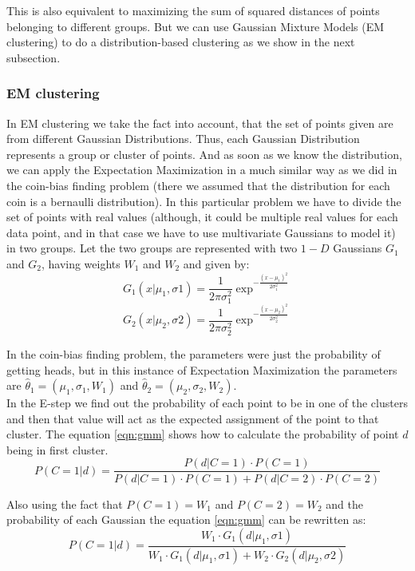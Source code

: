 \documentclass[journal, compsoc]{IEEEtran}
\begin{document}
This is also equivalent to maximizing the sum of squared distances of points belonging to different groups. But we can use Gaussian Mixture Models (EM clustering) to
do a distribution-based clustering as we show in the next subsection.

\subsubsection{EM clustering}
In EM clustering we take the fact into account, that the set of points given are from different Gaussian Distributions.
Thus, each Gaussian Distribution represents a group or cluster of points\cite{aibook}. And as soon as we know the distribution, we can
apply the Expectation Maximization in a much similar way as we did in the coin-bias finding problem (there we assumed that the
distribution for each coin is a bernaulli distribution). In this particular problem we have to divide the set of points with
real values (although, it could be multiple real values for each data point, and in that case we have to use multivariate
Gaussians to model it) in two groups. Let the two groups are represented with two $1-D$ Gaussians $G_{1}$ and $G_{2}$, having
weights $W_1$ and $W_2$ and given by:
\[
    G_{1}(x | \mu_{1}, \sigma{1}) = \frac{1}{2\pi\sigma_{1}^{2}}\exp^{-\frac{(x - \mu_{1})^{2}}{2\sigma_{1}^{2}}}
\]
\[
    G_{2}(x | \mu_{2}, \sigma{2}) = \frac{1}{2\pi\sigma_{2}^{2}}\exp^{-\frac{(x - \mu_{2})^{2}}{2\sigma_{2}^{2}}}
\]

In the coin-bias finding problem, the parameters were just the probability of getting heads, but in this
instance of Expectation Maximization the parameters are ${\hat{\theta}_{1} = (\mu_{1}, \sigma_{1}, W_1)}$ and
$\hat{\theta}_{2} = (\mu_{2}, \sigma_{2}, W_2)$.\\

In the E-step we find out the probability of each point to be in one of the clusters and then that value will act as the expected assignment
of the point to that cluster. The equation \ref{eqn:gmm} shows how to calculate the probability of point $d$ being in first cluster.
\begin{equation}
\label{eqn:gmm}
P(C = 1 | d) = \frac{P(d | C = 1)\cdot P(C = 1)}{P(d | C = 1)\cdot P(C = 1) + P(d | C = 2)\cdot P(C = 2)}
\end{equation}

Also using the fact that $P(C = 1) = W_{1}$ and $P(C = 2) = W_{2}$ and the probability of each Gaussian the equation \ref{eqn:gmm} can be
rewritten as:
\begin{equation}
\label{eqn:gmmfinal}
P(C = 1 | d) = \frac{W_{1} \cdot G_{1}(d | \mu_{1}, \sigma{1})}{W_1\cdot G_{1}(d | \mu_{1}, \sigma{1}) + W_2\cdot G_{2}(d | \mu_{2}, \sigma{2})}
\end{equation}
\end{document}
